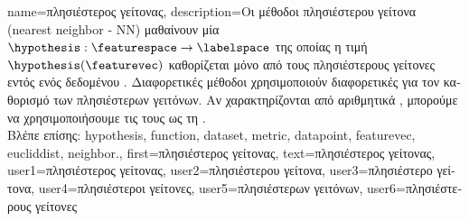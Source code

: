 {name={\foreignlanguage{greek}{πλησιέστερος γείτονας}},
	description={\foreignlanguage{greek}{Οι μέθοδοι πλησιέστερου γείτονα} 
		(nearest neighbor - NN) \foreignlanguage{greek}{μαθαίνουν μία}  
		$\hypothesis: \featurespace \rightarrow \labelspace$ \foreignlanguage{greek}{της οποίας η τιμή}  
		$\hypothesis(\featurevec)$ \foreignlanguage{greek}{καθορίζεται μόνο από τους πλησιέστερους γείτονες εντός ενός 
		δεδομένου} . \foreignlanguage{greek}{Διαφορετικές μέθοδοι χρησιμοποι\-ούν διαφορετικές}
		 \foreignlanguage{greek}{για τον καθορισμό των πλησιέστερων γειτόνων. Αν}   
		\foreignlanguage{greek}{χαρακτηρίζονται από αριθμητικά} , \foreignlanguage{greek}{μπορούμε 
		να χρησιμοποιήσουμε τις}  \foreignlanguage{greek}{τους ως τη} .
		\\
		\foreignlanguage{greek}{Βλέπε επίσης:} \gls{hypothesis}, \gls{function}, \gls{dataset}, \gls{metric}, \gls{datapoint}, \gls{featurevec}, 
		\gls{eucliddist}, \gls{neighbor}.},
	first={\foreignlanguage{greek}{πλησιέστερος γεί\-τονας}},
	text={\foreignlanguage{greek}{πλησιέστερος γεί\-τονας}},
	user1={\foreignlanguage{greek}{πλησιέστερος γεί\-τονας}}, %
   	user2={\foreignlanguage{greek}{πλησιέστερου γείτονα}}, %
	user3={\foreignlanguage{greek}{πλησιέστερο γείτονα}}, %
   	user4={\foreignlanguage{greek}{πλησιέστεροι γείτονες}}, %
	user5={\foreignlanguage{greek}{πλησιέστερων γειτόνων}}, %
   	user6={\foreignlanguage{greek}{πλησιέστερους γείτονες}} %
}

